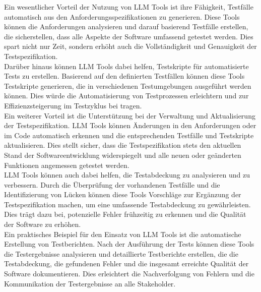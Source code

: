 Ein wesentlicher Vorteil der Nutzung von LLM Tools ist ihre Fähigkeit, Testfälle automatisch aus den Anforderungsspezifikationen 
zu generieren. Diese Tools können die Anforderungen analysieren und darauf basierend Testfälle erstellen, die sicherstellen, 
dass alle Aspekte der Software umfassend getestet werden. Dies spart nicht nur Zeit, sondern erhöht auch die Vollständigkeit 
und Genauigkeit der Testspezifikation.\\

Darüber hinaus können LLM Tools dabei helfen, Testskripte für automatisierte Tests zu erstellen. Basierend auf den definierten 
Testfällen können diese Tools Testskripte generieren, die in verschiedenen Testumgebungen ausgeführt werden können. Dies würde 
die Automatisierung von Testprozessen erleichtern und zur Effizienzsteigerung im Testzyklus bei tragen.\\

Ein weiterer Vorteil ist die Unterstützung bei der Verwaltung und Aktualisierung der Testspezifikation. LLM Tools können Änderungen 
in den Anforderungen oder im Code automatisch erkennen und die entsprechenden Testfälle und Testskripte aktualisieren. Dies stellt 
sicher, dass die Testspezifikation stets den aktuellen Stand der Softwareentwicklung widerspiegelt und alle neuen oder geänderten 
Funktionen angemessen getestet werden.\\

LLM Tools können auch dabei helfen, die Testabdeckung zu analysieren und zu verbessern. Durch die Überprüfung der vorhandenen Testfälle 
und die Identifizierung von Lücken können diese Tools Vorschläge zur Ergänzung der Testspezifikation machen, um eine umfassende 
Testabdeckung zu gewährleisten. Dies trägt dazu bei, potenzielle Fehler frühzeitig zu erkennen und die Qualität der Software zu erhöhen.\\

Ein praktisches Beispiel für den Einsatz von LLM Tools ist die automatische Erstellung von Testberichten. Nach der Ausführung der Tests 
können diese Tools die Testergebnisse analysieren und detaillierte Testberichte erstellen, die die Testabdeckung, die gefundenen Fehler 
und die insgesamt erreichte Qualität der Software dokumentieren. Dies erleichtert die Nachverfolgung von Fehlern und die Kommunikation 
der Testergebnisse an alle Stakeholder.
